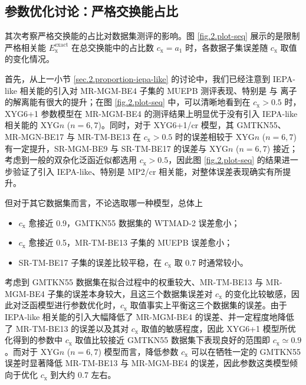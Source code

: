 \subsection{参数优化讨论：严格交换能占比}
\label{sec.2.proportion-exchange}

其次考察严格交换能的占比对数据集测评的影响。图 \ref{fig.2.plot-seq} 展示的是限制严格相关能 $E_\mathrm{x}^\text{exact}$ 在总交换能中的占比数 $c_\mathrm{x} = a_1$ 时，各数据子集误差随 $c_\mathrm{x}$ 取值的变化情况。

首先，从上一小节 \ref{sec.2.proportion-iepa-like} 的讨论中，我们已经注意到 IEPA-like 相关能的引入对 MR-MGM-BE4 子集的 MUEPB 测评表现、特别是  与  离子的解离能有很大的提升；在图 \ref{fig.2.plot-seq} 中，可以清晰地看到在 $c_\mathrm{x} > 0.5$ 时，XYG6+1 参数模型在 MR-MGM-BE4 的测评结果上明显优于没有引入 IEPA-like 相关能的 XYG$n$ ($n=6,7$)。同时，对于 XYG6+1/cr 模型，其 GMTKN55、MR-MGN-BE17 与 MR-TM-BE13 在 $c_\mathrm{x} > 0.5$ 时的误差相较于 XYG$n$ ($n=6,7$) 有一定提升，SR-MGM-BE9 与 SR-TM-BE17 的误差与 XYG$n$ ($n=6,7$) 接近；考虑到一般的双杂化泛函近似都选用 $c_\mathrm{x} > 0.5$，因此图 \ref{fig.2.plot-seq} 的结果进一步验证了引入 IEPA-like、特别是 MP2/cr 相关能，对整体误差表现确实有所提升。

但对于其它数据集而言，不论选取哪一种模型，总体上
\begin{itemize}[nosep]
  \item $c_\mathrm{x}$ 愈接近 0.9，GMTKN55 数据集的 WTMAD-2 误差愈小；
  \item $c_\mathrm{x}$ 愈接近 0.5，MR-TM-BE13 子集的 MUEPB 误差愈小；
  \item SR-TM-BE17 子集的误差比较平稳，在 $c_\mathrm{x}$ 取 0.7 时通常较小。
\end{itemize}
考虑到 GMTKN55 数据集在拟合过程中的权重较大、MR-TM-BE13 与 MR-MGM-BE4 子集的误差本身较大，且这三个数据集误差对 $c_\mathrm{x}$ 的变化比较敏感，因此对泛函模型进行参数优化时，$c_\mathrm{x}$ 取值事实上平衡这三个数据集的误差。由于 IEPA-like 相关能的引入大幅降低了 MR-MGM-BE4 的误差、并一定程度地降低了 MR-TM-BE13 的误差以及其对 $c_\mathrm{x}$ 取值的敏感程度，因此 XYG6+1 模型所优化得到的参数中 $c_\mathrm{x}$ 取值比较接近 GMTKN55 数据集下表现良好的范围即 $c_\mathrm{x} \simeq 0.9$。而对于 XYG$n$ ($n=6,7$) 模型而言，降低参数 $c_\mathrm{x}$ 可以在牺牲一定的 GMTKN55 误差时显著降低 MR-TM-BE13 与 MR-MGM-BE4 的误差，因此参数这类模型倾向于优化 $c_\mathrm{x}$ 到大约 0.7 左右。

